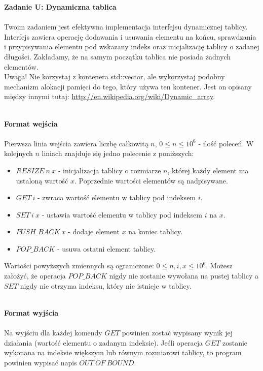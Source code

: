 \documentclass[
  fontsize=12pt  %
 ,english        %
 ,headinclude    %
 ,headsepline    %
]{scrbook}       %
\begin{document}
\vspace{50 mm}
\hspace{50 mm}
\newline

\par{\Large \textbf{Zadanie U: Dynamiczna tablica}} \\ \\
Twoim zadaniem jest efektywna implementacja interfejsu dynamicznej tablicy. Interfejs zawiera operację dodawania i usuwania elementu na końcu, sprawdzania i przypisywania elementu pod wskazany indeks oraz inicjalizację tablicy o zadanej długości. Zakładamy, że na samym początku tablica nie posiada żadnych elementów.
\\
Uwaga! Nie korzystaj z kontenera std::vector, ale wykorzystaj podobny mechanizm alokacji pamięci do tego, który używa ten kontener. Jest on opisany między innymi tutaj: \url{http://en.wikipedia.org/wiki/Dynamic_array}.
\\ \\
\par{\Large \textbf{Format wejścia}} \\ \\
Pierwsza linia wejścia zawiera liczbę całkowitą $n$, $0 \leq n \leq 10^6$ - ilość poleceń. W kolejnych $n$ liniach znajduje się jedno polecenie z poniższych:
\begin{itemize}
  \item $RESIZE \ n \ x$ - inicjalizacja tablicy o rozmiarze $n$, której każdy element ma ustaloną wartość $x$. Poprzednie wartości elementów są nadpisywane.
  \item $GET \ i$ - zwraca wartość elementu w tablicy pod indeksem $i$.
  \item $SET \ i \ x$ - ustawia wartość elementu w tablicy pod indeksem $i$ na $x$.
  \item $PUSH\_BACK \ x$ - dodaje element $x$ na koniec tablicy.
  \item $POP\_BACK$ - usuwa ostatni element tablicy.
\end{itemize}

Wartości powyższych zmiennych są ograniczone: $0 \leq n, i, x \leq 10^6$. Możesz założyć, że operacja $POP\_BACK$ nigdy nie zostanie wywołana na pustej tablicy a $SET$ nigdy nie otrzyma indeksu, który nie istnieje w tablicy.
\\ \\
\par{\Large \textbf{Format wyjścia}} \\ \\
Na wyjściu dla każdej komendy $GET$ powinien zostać wypisany wynik jej działania (wartość elementu o zadanym indeksie). Jeśli operacja $GET$ zostanie wykonana na indeksie większym lub równym rozmiarowi tablicy, to program powinien wypisać napis $OUT \ OF \ BOUND$.
~\\
\vspace{50 mm}
\hspace{50 mm}
\newline
\newline
\end{document}
